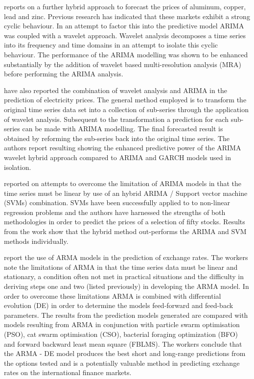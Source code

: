 \cite{Kriechbaumer201432} reports on a further hybrid approach to forecast the prices of aluminum, copper, lead and zinc. Previous research has indicated that these markets exhibit a strong cyclic behaviour. In an attempt to factor this into the predictive model ARIMA was coupled with a wavelet approach. Wavelet analysis decomposes a time series into its frequency and time domains in an attempt to isolate this cyclic behaviour. The performance of the ARIMA modelling was shown to be enhanced substantially by the addition of wavelet based multi-resolution analysis (MRA) before performing the ARIMA analysis.

\cite{Tan20103606} have also reported the combination of wavelet analysis and ARIMA in the prediction of electricity prices. The general method employed is to transform the original time series data set into a collection of sub-series through the application of wavelet analysis. Subsequent to the transformation a prediction for each sub-series can be made with ARIMA modelling. The final forecasted result is obtained by reforming the sub-series back into the original time series. The authors report resulting showing the enhanced predictive power of the ARIMA wavelet hybrid approach compared to ARIMA and GARCH models used in isolation.

\cite{Pai2005497} reported on attempts to overcome the limitation of ARIMA models in that the time series must be linear by use of an hybrid ARIMA / Support vector machine (SVMs) combination. SVMs have been successfully applied to to non-linear regression problems and the authors have harnessed the strengths of both methodologies in order to predict the prices of a selection of fifty stocks. Results from the work show that the hybrid method out-performs the ARIMA and SVM methods individually.

\cite{Rout20147} report the use of ARMA models in the prediction of exchange rates. The workers note the limitations of ARMA in that the time series data must be linear and stationary, a condition often not met in practical situations and the difficulty in deriving steps one and two (listed previously) in developing the ARMA model. In order to overcome these limitations ARMA is combined with differential evolution (DE) in order to determine the models feed-forward and feed-back parameters. The results from the prediction models generated are compared with models resulting from ARMA in conjunction with particle swarm optimisation (PSO), cat swarm optimisation (CSO), bacterial foraging optimization (BFO) and forward backward least mean square (FBLMS). The workers conclude that the ARMA - DE model produces the best short and long-range predictions from the options tested and is a potentially valuable method in predicting exchange rates on the international finance markets.

